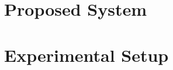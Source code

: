 \documentclass[conference]{IEEEtran}
\begin{document}
\section{Proposed System}

\section{Experimental Setup}
\end{document}
